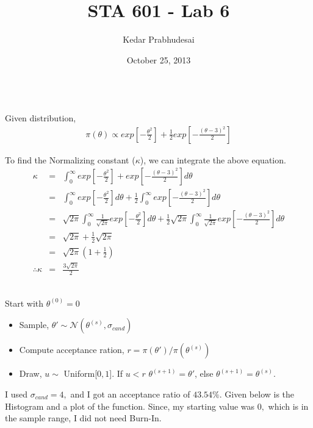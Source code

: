 \documentclass{article}
\title{STA 601 - Lab 6}
\author{Kedar Prabhudesai}
\date{October 25, 2013}
\begin{document}
\maketitle

\\

Given distribution,
\begin{eqnarray*}
\pi(\theta) \propto exp\left[-\frac{\theta^2}{2}\right] + \frac{1}{2}exp\left[-\frac{(\theta-3)^2}{2}\right]
\end{eqnarray*}

To find the Normalizing constant ($\kappa$), we can integrate the above equation.
\begin{eqnarray*}
\kappa &=& \int_0^\infty{exp\left[-\frac{\theta^2}{2}\right] + exp\left[-\frac{(\theta-3)^2}{2}\right]}d\theta\\
&=& \int_0^\infty{exp\left[-\frac{\theta^2}{2}\right]}d\theta + \frac{1}{2}\int_0^\infty{exp\left[-\frac{(\theta-3)^2}{2}\right]}d\theta\\
&=& \sqrt{2\pi}\int_0^\infty{\frac{1}{\sqrt{2\pi}}exp\left[-\frac{\theta^2}{2}\right]}d\theta + \frac{1}{2}\sqrt{2\pi}\int_0^\infty{\frac{1}{\sqrt{2\pi}}exp\left[-\frac{(\theta-3)^2}{2}\right]}d\theta\\
&=& \sqrt{2\pi} + \frac{1}{2}\sqrt{2\pi}\\
&=& \sqrt{2\pi}\left(1+\frac{1}{2}\right)\\
\therefore \kappa &=& \frac{3\sqrt{2\pi}}{2}
\end{eqnarray*}

\pagebreak

\\

Start with $\theta^{(0)} = 0$
\begin{itemize}
\item Sample, $\theta' \sim \mathcal{N}(\theta^{(s)},\sigma_{cand})$
\item Compute acceptance ration, $r = \pi(\theta')/\pi(\theta^{(s)})$
\item Draw, $u \sim$ Uniform[$0,1$]. If $u < r$ $\theta^{(s+1)} = \theta'$, else $\theta^{(s+1)} = \theta^{(s)}$.\\
\end{itemize}

I used $\sigma_{cand} = 4,$ and I got an acceptance ratio of $43.54\%.$ Given below is the Histogram and a plot of the function. Since, my starting value was $0,$ which is in the sample range, I did not need Burn-In.
\end{document}
